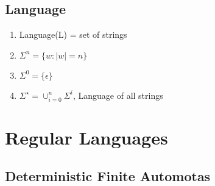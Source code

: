 \documentclass[11pt]{article}
\begin{document}
\subsection{Language}
\label{sec-1.4}

\begin{enumerate}
\item Language(L) = set of strings
\item $\Sigma^n = \{w : |w| = n\}$
\item $\Sigma^0 = \{ \epsilon \}$
\item $\Sigma^{\star} = \cup^n_{i=0} \Sigma^i$, Language of all strings
\end{enumerate}
\section{Regular Languages}
\label{sec-2}

\subsection{Deterministic Finite Automotas}
\label{sec-2.1}
\end{document}
